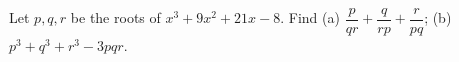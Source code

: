 Let $p,q,r$ be the roots of $x^3+9x^2+21x-8$. Find (a) $\dfrac{p}{qr}+\dfrac{q}{rp}+\dfrac{r}{pq}$; (b) $p^3+q^3+r^3-3pqr$.
